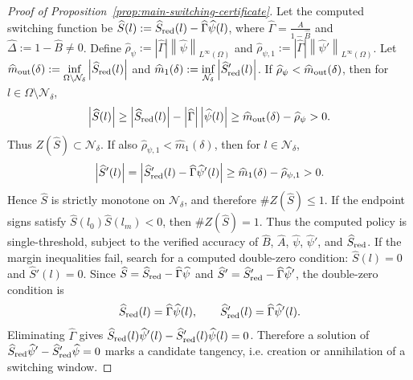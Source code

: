 \documentclass[pdflatex,sn-mathphys-num]{sn-jnl}
\theoremstyle{thmstyleone}
\theoremstyle{definition}
\theoremstyle{remark}
\newcommand{\Om}{\Omega}
\newcommand{\norm}[1]{\left\lVert#1\right\rVert}
\newcommand{\abs}[1]{\left\lvert#1\right\rvert}
\numberwithin{equation}{section}
\begin{document}
\begin{proof}[Proof of Proposition~\ref{prop:main-switching-certificate}]
Let the computed switching function be
$\displaystyle 
\widehat S(l)
:=
\widehat S_{\rm red}(l)-\widehat\Gamma\widehat\psi(l)$,
where
$\displaystyle 
\widehat\Gamma
=
\frac{\widehat A}{1-\widehat B}$ and
$\widehat\Delta:=1-\widehat B\ne0$.
Define
$\displaystyle 
\widehat\rho_\psi
:=
\abs{\widehat\Gamma}
\norm{\widehat\psi}_{L^\infty(\Om)}$ and
$\widehat\rho_{\psi,1}
:=
\abs{\widehat\Gamma}
\norm{\widehat\psi'}_{L^\infty(\Om)}$.
Let
$\displaystyle 
\widehat m_{\rm out}(\delta)
:=
\inf_{\Om\setminus\mathcal N_\delta}
\abs{\widehat S_{\rm red}(l)}$ and
$\displaystyle 
\widehat m_1(\delta)
:=
\inf_{\mathcal N_\delta}
\abs{\widehat S_{\rm red}'(l)}$.
If
$\displaystyle 
\widehat\rho_\psi<\widehat m_{\rm out}(\delta)$,
then for \(l\in\Om\setminus\mathcal N_\delta\),
\[
\abs{\widehat S(l)}
\ge
\abs{\widehat S_{\rm red}(l)}
-
\abs{\widehat\Gamma}\abs{\widehat\psi(l)}
\ge
\widehat m_{\rm out}(\delta)-\widehat\rho_\psi>0.
\]
Thus
$\displaystyle 
Z(\widehat S)
\subset
\mathcal N_\delta$.
If also
$\displaystyle 
\widehat\rho_{\psi,1}<\widehat m_1(\delta)$,
then for \(l\in\mathcal N_\delta\),
\[
\abs{\widehat S'(l)}
=
\abs{\widehat S_{\rm red}'(l)-\widehat\Gamma\widehat\psi'(l)}
\ge
\widehat m_1(\delta)-\widehat\rho_{\psi,1}>0.
\]
Hence \(\widehat S\) is strictly monotone on \(\mathcal N_\delta\), and therefore
$\displaystyle 
\# Z(\widehat S)\le1$.
If the endpoint signs satisfy
$\displaystyle 
\widehat S(l_0)\widehat S(l_m)<0$,
then
$\displaystyle 
\#Z(\widehat S)=1$.
Thus the computed policy is single-threshold, subject to the verified accuracy of
$\widehat B$,
$\widehat A$, 
$\widehat\psi$, 
$\widehat\psi'$,
and
$\widehat S_{\rm red}$.
If the margin inequalities fail, search for a computed double-zero condition:
$\widehat S(l)=0$ and
$\widehat S'(l)=0$.
Since
$\displaystyle \widehat S=\widehat S_{\rm red}-\widehat\Gamma\widehat\psi$ and
$\displaystyle \widehat S'=\widehat S_{\rm red}'-\widehat\Gamma\widehat\psi'$,
the double-zero condition is
\[
\widehat S_{\rm red}(l)=\widehat\Gamma\widehat\psi(l),
\qquad
\widehat S_{\rm red}'(l)=\widehat\Gamma\widehat\psi'(l).
\]
Eliminating \(\widehat\Gamma\) gives
$\displaystyle 
\widehat S_{\rm red}(l)\widehat\psi'(l)
-
\widehat S_{\rm red}'(l)\widehat\psi(l)
=0$.
Therefore a solution of
$\displaystyle 
\widehat S_{\rm red}\widehat\psi'
-
\widehat S_{\rm red}'\widehat\psi
=0$
marks a candidate tangency, i.e. creation or annihilation of a switching window.
\end{proof}
\end{document}
